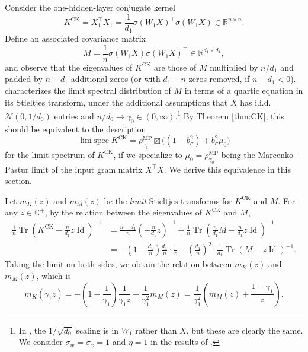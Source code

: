 \documentclass{article}
\theoremstyle{definition}
\newcommand{\R}{\mathbb{R}}
\newcommand{\C}{\mathbb{C}}
\newcommand{\N}{\mathcal{N}}
\newcommand{\Id}{\operatorname{Id}}
\newcommand{\CK}{\text{CK}}
\newcommand{\MP}{\text{MP}}
\newcommand{\Tr}{\operatorname{Tr}}
\newcommand{\1}{\mathbf{1}}
\newcommand{\limspec}{\operatorname{lim\;spec}}
\begin{document}
Consider the one-hidden-layer conjugate kernel
\[K^\CK=X_1^\top X_1=\frac{1}{d_1}\sigma(W_1X)^\top \sigma(W_1X) \in
\R^{n\times n}.\]
Define an associated covariance matrix
\begin{equation}\label{eq:CKcompanion}
M=\frac{1}{n}\sigma(W_1X)\sigma(W_1X)^\top \in \R^{d_1 \times d_1},
\end{equation}
and observe that the eigenvalues of $K^\CK$ are those of $M$
multiplied by $n/d_1$ and padded by $n-d_1$ additional
zeros (or with $d_1-n$ zeros removed, if $n-d_1<0$). 
\cite[Theorem 1]{pennington2017nonlinear} characterizes the
limit spectral distribution of $M$ in terms of a quartic equation in its Stieltjes
transform, under the additional assumptions that $X$ has i.i.d.\ $\N(0,1/d_0)$
entries and $n/d_0 \to \gamma_0 \in (0,\infty)$.\footnote{In \cite{pennington2017nonlinear}, the
$1/\sqrt{d_0}$ scaling is in $W_1$ rather than $X$, but these are clearly the
same. We consider $\sigma_w=\sigma_x=1$ and
$\eta=1$ in the results of \cite{pennington2017nonlinear}.}
By Theorem \ref{thm:CK}, this should be equivalent to the description
\begin{equation}\label{eq:onelayerCK}
\limspec K^\CK
=\rho_{\gamma_1}^\MP \boxtimes \Big((1-b_\sigma^2)+b_\sigma^2 \mu_0\Big)
\end{equation}
for the limit spectrum of $K^\CK$, if we specialize to
$\mu_0=\rho_{\gamma_0}^\MP$ being the Marcenko-Pastur limit
of the input gram matrix $X^\top X$. We derive this equivalence in
this section.

Let $m_K(z)$ and $m_M(z)$ be the \emph{limit} Stieltjes transforms for $K^\CK$
and $M$. For any $z \in \C^+$, by the relation between the eigenvalues of
$K^\CK$ and $M$,
\begin{align*}
\frac{1}{n}\Tr\left(K^\CK-\frac{n}{d_1}z\Id\right)^{-1}&=\frac{n-d_1}{n}\left(-\frac{n}{d_1}z\right)^{-1}
+\frac{1}{n}\Tr\left(\frac{n}{d_1}M-\frac{n}{d_1}z\Id\right)^{-1}\\
&=-\left(1-\frac{d_1}{n}\right)\frac{d_1}{n}\cdot
\frac{1}{z}+\left(\frac{d_1}{n}\right)^2
\cdot \frac{1}{d_1}\Tr(M-z\Id)^{-1}.
\end{align*}
Taking the limit on both sides, we obtain the relation between $m_K(z)$ and
$m_M(z)$, which is
\begin{equation}\label{eq:CKMrelation}
m_K(\gamma_1 z)=-\left(1-\frac{1}{\gamma_1}\right)\frac{1}{\gamma_1
z}+\frac{1}{\gamma_1^2}m_M(z)
=\frac{1}{\gamma_1^2}\left(m_M(z)+\frac{1-\gamma_1}{z}\right).
\end{equation}
\end{document}
